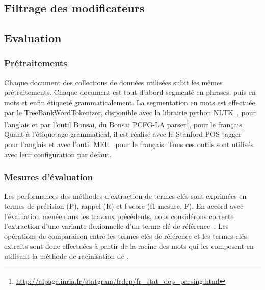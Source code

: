     \subsection{Filtrage des modificateurs}
    \label{subsec:main-automatic_keyphrase_annotation-keyphrase_candidate_selection-modifiers_filtering}

    \subsection{Evaluation}
    \label{subsec:main-automatic_keyphrase_annotation-keyphrase_candidate_selection-evaluation}
      \subsubsection{Prétraitements}
      \label{subsubsec:main-automatic_keyphrase_annotation-keyphrase_candidate_selection-evaluation-preprocessing}
        Chaque document des collections de données utilisées subit les mêmes
        prétraitements. Chaque document est tout d'abord segmenté en phrases,
        puis en mots et enfin étiqueté grammaticalement. La segmentation en mots
        est effectuée par le TreeBankWordTokenizer, disponible avec la librairie
        python NLTK~\cite[\textit{Natural Language ToolKit}]{bird2009nltk}, pour
        l'anglais et par l'outil Bonsai, du Bonsai PCFG-LA
        parser\footnote{\url{http://alpage.inria.fr/statgram/frdep/fr_stat_dep_parsing.html}},
        pour le français. Quant à l'étiquetage grammatical, il est réalisé avec
        le Stanford POS tagger~\cite{toutanova2003stanfordpostagger} pour
        l'anglais et avec l'outil MElt~\cite{denis2009melt} pour le français.
        Tous ces outils sont utilisés avec leur configuration par défaut.
      
      \subsubsection{Mesures d'évaluation}
      \label{subsubsec:main-automatic_keyphrase_annotation-keyphrase_candidate_selection-evaluation-evaluation_measures}
        Les performances des méthodes d'extraction de termes-clés sont exprimées
        en termes de précision (P), rappel (R) et f-score (f1-mesure, F). En
        accord avec l'évaluation menée dans les travaux précédents, nous
        considérons correcte l'extraction d'une variante flexionnelle d'un
        terme-clé de référence~\cite{kim2010semeval}. Les opérations de
        comparaison entre les termes-clés de référence et les termes-clés
        extraits sont donc effectuées à partir de la racine des mots qui les
        composent en utilisant la méthode de racinisation de
        .

